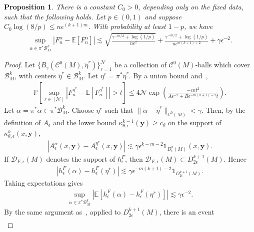 \documentclass[11pt,reqno]{amsproc}
\numberwithin{equation}{section}
\newcommand{\E}{\mathbb{E}}
\newcommand{\PP}{\mathbb{P}}
\newcommand{\one}{\mathbb{1}}
\newcommand{\by}{\mathbf{y}}
\newcommand{\cN}{\mathcal{N}}
\newcommand{\cB}{\mathcal{B}}
\newcommand{\cC}{\mathcal{C}}
\newcommand{\cD}{\mathcal{D}}
\newcommand{\talpha}{\tilde{\alpha}}
\newcommand{\teta}{\tilde{\eta}}
\newcommand{\ls}{\lesssim}
\newcommand{\ball}[3]{B_{#3}(#1, #2)} %
\newtheorem{proposition}[counter]{Proposition}
\theoremstyle{definition}
\theoremstyle{plain}
\begin{document}
\begin{proposition} \label{prop:off_diagonal_covering_variance}
    There is a constant $C_0>0$, depending only on the fixed data, such that the following holds. Let $p\in(0,1)$ and suppose $C_0\log(8/p)\leq n\epsilon^{(k+1)m}$. With probability at least $1-p$, we have
    \begin{align}
        \sup_{\alpha\in\pi^*\cB_M^k}|F_n^\alpha-\E[F_n^\alpha]|
        \ls \sqrt{\frac{\gamma^{-m/2}+\log(1/p)}{n\epsilon^2}}
        +\frac{\gamma^{-m/2}+\log(1/p)}{n\epsilon^{m(k+1)+2}}
        +\gamma\epsilon^{-2}.
    \end{align}
\end{proposition}
\begin{proof}
    Let $\{\ball{\cC^0(M)}{\teta^r}{\gamma}\}_{r=1}^{\cN}$ be a collection of $\cC^0(M)$-balls which cover $\cB_M^k$, with centers $\teta^r\in\cB_M^k$. Let $\eta^r=\pi^*\teta^r$. By a union bound and~,
    \begin{align} \label{eq:codiff_union_variance}
        \PP\left[\sup_{r\in[\cN]}|F_n^{\eta^r}-\E[F_n^{\eta^r}]|>t\right]
        \leq 4\cN\exp\left(\frac{-cnt^2}{A\epsilon^{-2}+B\epsilon^{-m(k+1)-2}t}\right).
    \end{align}
    Let $\alpha=\pi^*\talpha\in\pi^*\cB_M^k$. Choose $\eta^r$ such that $\|\talpha-\teta^r\|_{\cC^0(M)}<\gamma$. Then, by the definition of $A_\epsilon$ and the lower bound $\kappa_{\theta,\epsilon}^{k-1}(\by)\geq c_\theta$ on the support of $\kappa_{\theta,\epsilon}^{k}(x,\by)$,
    \begin{align}
        |A^\alpha_\epsilon(x,\by)-A^{\eta^r}_\epsilon(x,\by)|\ls \gamma\epsilon^{k-m-2}\one_{D^k_\epsilon(M)}(x,\by).
    \end{align}
    If $\cD_{F,\epsilon}(M)$ denotes the support of $h^F_\epsilon$, then $\cD_{F,\epsilon}(M)\subset D^{k+1}_{2\epsilon}(M)$. Hence
    \begin{align}
        |h^F_\epsilon(\alpha)-h^F_\epsilon(\eta^r)|\ls \gamma\epsilon^{-m(k+1)-2}\one_{D^{k+1}_{2\epsilon}(M)}.
    \end{align}
    Taking expectations gives
    \begin{align}
        \sup_{\alpha\in\pi^*\cB_M^k}|\E[h^F_\epsilon(\alpha)-h^F_\epsilon(\eta^r)]|\ls \gamma\epsilon^{-2}.
    \end{align}
    By the same argument as~, applied to $D^{k+1}_{2\epsilon}(M)$, there is an event
    \begin{align}

\end{align}
\end{proof}
\end{document}
